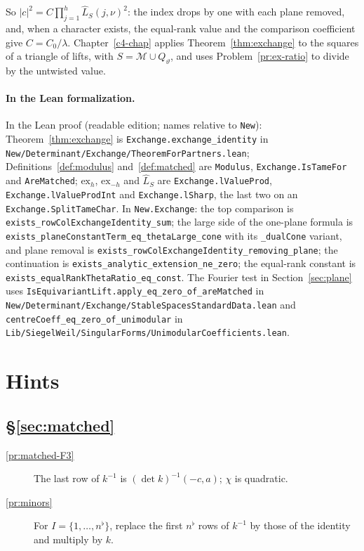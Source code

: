 \documentclass[reqno]{amsart}
\newcounter{chap}
\theoremstyle{definition}
\theoremstyle{plain}
\newcommand{\ex}{\mathrm{ex}}
\newcommand{\nb}{n^\flat}
\newcommand{\tl}[1]{\texttt{#1}}
\begin{document}
So \(\lvert c\rvert^2 = C\prod_{j=1}^h\hat L_{S}(j,\nu)^2\): the index drops by one with each plane removed, and, when a character exists, the equal-rank value and the comparison coefficient give \(C = C_0/\lambda\).  Chapter~\ref{c4-chap} applies Theorem~\ref{thm:exchange} to the squares of a triangle of lifts, with \(S = \mathcal M \cup Q_\vartheta\), and uses Problem~\ref{pr:ex-ratio} to divide by the untwisted value.

{\raggedright
\paragraph{In the Lean formalization.}
In the Lean proof \cite{GL} (readable edition; names relative to \tl{New}): Theorem~\ref{thm:exchange} is \tl{Exchange.exchange\_identity} in \tl{New/Determinant/Exchange/TheoremForPartners.lean}; Definitions~\ref{def:modulus} and~\ref{def:matched} are \tl{Modulus}, \tl{Exchange.IsTameFor} and \tl{AreMatched}; \(\ex_h\), \(\ex_{-h}\) and \(\hat L_S\) are \tl{Exchange.lValueProd}, \tl{Exchange.lValueProdInt} and \tl{Exchange.lSharp}, the last two on an \tl{Exchange.SplitTameChar}.  In \tl{New.Exchange}: the top comparison is \tl{exists\_rowColExchangeIdentity\_sum}; the large side of the one-plane formula is \tl{exists\_planeConstantTerm\_eq\_thetaLarge\_cone} with its \tl{\_dualCone} variant, and plane removal is \tl{exists\_rowColExchangeIdentity\_removing\_plane}; the continuation is \tl{exists\_analytic\_extension\_ne\_zero}; the equal-rank constant is \tl{exists\_equalRankThetaRatio\_eq\_const}.  The Fourier test in Section~\ref{sec:plane} uses \tl{IsEquivariantLift.apply\_eq\_zero\_of\_areMatched} in \tl{New/Determinant/Exchange/StableSpacesStandardData.lean} and \tl{centreCoeff\_eq\_zero\_of\_unimodular} in \tl{Lib/SiegelWeil/SingularForms/UnimodularCoefficients.lean}.\par}

\section*{Hints}

\subsection*{\S\ref{sec:matched}}
\begin{description}
\item[\ref{pr:matched-F3}] The last row of \(k^{-1}\) is \((\det k)^{-1}(-c, a)\); \(\chi\) is quadratic.
\item[\ref{pr:minors}] For \(I = \{1, \dots, \nb\}\), replace the first \(\nb\) rows of \(k^{-1}\) by those of the identity and multiply by \(k\).
\end{description}
\end{document}
